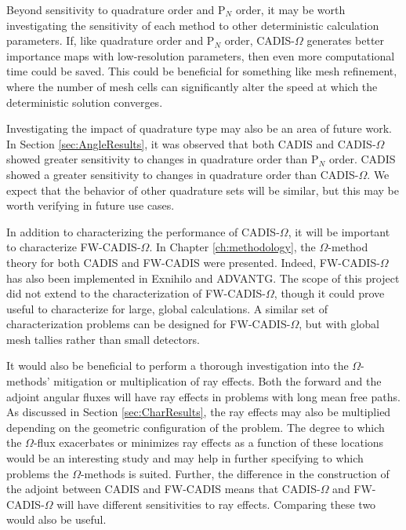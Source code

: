 Beyond sensitivity to quadrature order and P$_N$ order, it may be worth
investigating the sensitivity of each method to other deterministic calculation
parameters. If, like quadrature order and P$_N$ order, CADIS-$\Omega$ generates
better importance maps with low-resolution parameters, then even more
computational time could be saved. This could be beneficial for something like
mesh refinement, where the number of mesh cells can significantly alter the
speed at which the deterministic solution converges.

Investigating the impact of quadrature type may also be an area of future work.
In Section \ref{sec:AngleResults}, it was observed that both CADIS and
CADIS-$\Omega$ showed greater sensitivity to changes in quadrature order than
P$_N$ order. CADIS showed a greater sensitivity to changes in quadrature order
than CADIS-$\Omega$. We expect that the behavior of other quadrature sets will
be similar, but this may be worth verifying in future use cases.

In addition to characterizing the performance of CADIS-$\Omega$, it will be
important to characterize FW-CADIS-$\Omega$. In Chapter \ref{ch:methodology},
the $\Omega$-method theory for both CADIS and FW-CADIS were presented. Indeed,
FW-CADIS-$\Omega$ has also been implemented in Exnihilo and ADVANTG. The scope
of this project did not extend to the characterization of FW-CADIS-$\Omega$,
though
it could prove useful to characterize for large, global calculations. A similar
set of characterization problems can be designed for FW-CADIS-$\Omega$, but with
global mesh tallies rather than small detectors.

It would also be beneficial to
perform a thorough investigation into the $\Omega$-methods' mitigation or
multiplication of ray effects. Both the forward and the adjoint angular fluxes
will have ray effects in problems with long mean free paths. As discussed in
Section \ref{sec:CharResults},
the ray effects may also be multiplied depending on the geometric
configuration of the problem. The degree to which the $\Omega$-flux exacerbates
or minimizes ray effects as a function of these locations would be an
interesting study and may help in further specifying to which problems the
$\Omega$-methods is suited. Further, the difference in the construction of the
adjoint between CADIS and FW-CADIS means that CADIS-$\Omega$ and
FW-CADIS-$\Omega$ will have different sensitivities to ray effects. Comparing
these two would also be useful.

